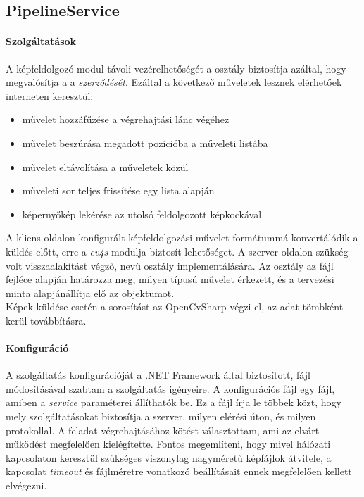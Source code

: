 \subsection{PipelineService}

\paragraph{Szolgáltatások}
A képfeldolgozó modul távoli vezérelhetőségét a  osztály biztosítja azáltal, hogy megvalósítja a a  \textit{szerződését}. Ezáltal a következő műveletek lesznek elérhetőek interneten keresztül:
\begin{itemize}
\item művelet hozzáfűzése a végrehajtási lánc végéhez
\item művelet beszúrása megadott pozícióba a műveleti listába
\item művelet eltávolítása a műveletek közül
\item műveleti sor teljes frissítése egy lista alapján
\item képernyőkép lekérése az utolsó feldolgozott képkockával
\end{itemize}

A kliens oldalon konfigurált képfeldolgozási művelet  formátummá konvertálódik a küldés előtt, erre a \emph{cv4s}  modulja biztosít lehetőséget. A szerver oldalon szükség volt visszaalakítást végző,  nevű osztály implementálására. Az osztály az  fájl fejléce alapján határozza meg, milyen típusú művelet érkezett, és a  tervezési minta alapjánállítja elő az objektumot.\\
Képek küldése esetén a sorosítást az OpenCvSharp végzi el, az adat  tömbként kerül továbbításra.

\paragraph{Konfiguráció} A szolgáltatás konfigurációját a .NET Framework által biztosított,  fájl módosításával szabtam a szolgáltatás igényeire. A konfigurációs fájl egy  fájl, amiben a \emph{service} paraméterei állíthatók be. Ez a fájl írja le többek közt, hogy mely szolgáltatásokat biztosítja a szerver, milyen elérési úton, és milyen protokollal. A feladat végrehajtásához  kötést választottam, ami az elvárt működést megfelelően kielégítette. Fontos megemlíteni, hogy mivel hálózati kapcsolaton keresztül szükséges viszonylag nagyméretű képfájlok átvitele, a kapcsolat \emph{timeout} és fájlméretre vonatkozó beállításait ennek megfelelően kellett elvégezni.

